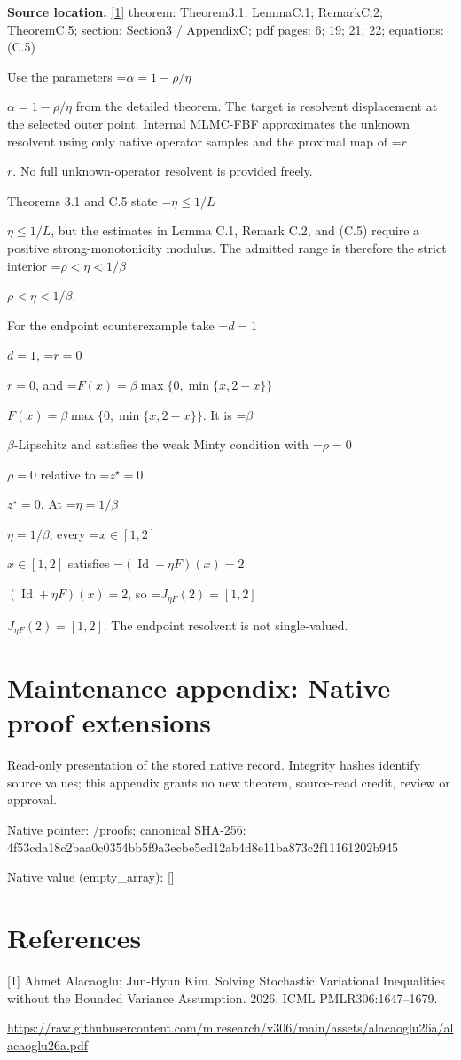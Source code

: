 \documentclass[10pt,a4paper]{article}
\newcommand{\AtlasMath}[1]{\par\begingroup\centering\setbox0=\hbox{$\displaystyle #1$}\ifdim\wd0>1.4\linewidth\typeout{ATLAS WIDE FORMULA: \the\wd0}\fi\ifdim\wd0>\linewidth\resizebox{\linewidth}{!}{\box0}\else\box0\fi\par\endgroup}
\newcommand{\AtlasInlineMath}[1]{\begingroup\setbox0=\hbox{$#1$}\ifdim\wd0>.4\linewidth\endgroup\AtlasMath{#1}\else\endgroup$#1$\fi}
\begin{document}
\textbf{Source location.} \href{https://raw.githubusercontent.com/mlresearch/v306/main/assets/alacaoglu26a/alacaoglu26a.pdf}{[1]} theorem: Theorem3.1; LemmaC.1; RemarkC.2; TheoremC.5; section: Section3 / AppendixC; pdf pages: 6; 19; 21; 22; equations: (C.5)



Use the parameters \AtlasInlineMath{\alpha=1-\rho/\eta} from the detailed theorem. The target is resolvent displacement at the selected outer point. Internal MLMC-FBF approximates the unknown resolvent using only native operator samples and the proximal map of \AtlasInlineMath{r}. No full unknown-operator resolvent is provided freely.



Theorems 3.1 and C.5 state \AtlasInlineMath{\eta\le1/L}, but the estimates in Lemma C.1, Remark C.2, and (C.5) require a positive strong-monotonicity modulus. The admitted range is therefore the strict interior \AtlasInlineMath{\rho<\eta<1/\beta}.



For the endpoint counterexample take \AtlasInlineMath{d=1}, \AtlasInlineMath{r=0}, and \AtlasInlineMath{F(x)=\beta\max\{0,\min\{x,2-x\}\}}. It is \AtlasInlineMath{\beta}-Lipschitz and satisfies the weak Minty condition with \AtlasInlineMath{\rho=0} relative to \AtlasInlineMath{z^\star=0}. At \AtlasInlineMath{\eta=1/\beta}, every \AtlasInlineMath{x\in[1,2]} satisfies \AtlasInlineMath{(\operatorname{Id}+\eta F)(x)=2}, so \AtlasInlineMath{J_{\eta F}(2)=[1,2]}. The endpoint resolvent is not single-valued.



\section{Maintenance appendix: Native proof extensions}


Read-only presentation of the stored native record. Integrity hashes identify source values; this appendix grants no new theorem, source-read credit, review or approval.



Native pointer: /proofs; canonical SHA-256: 4f53cda18c2baa0c0354bb5f\allowbreak{}9a3ecbe5ed12ab4d8e11ba87\allowbreak{}3c2f11161202b945



Native value (empty\_array): []



\section{References}


[1] Ahmet Alacaoglu; Jun-Hyun Kim. Solving Stochastic Variational Inequalities without the Bounded Variance Assumption. 2026. ICML PMLR306:1647--1679.



\url{https://raw.githubusercontent.com/mlresearch/v306/main/assets/alacaoglu26a/alacaoglu26a.pdf}
\end{document}

